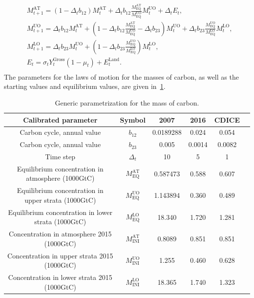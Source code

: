 \documentclass[11pt, a4paper, pdftex, twoside, dvipsnames]{article}
\begin{document}
\begin{appendices}
\begin{align}
& \label{eq:MAT_appendix}  M^{\text{AT}}_{t+1} = (1- \Delta_tb_{12}) M^{\text{AT}}_{t} + \Delta_tb_{12} \frac{M^{\text{AT}}_{\text{EQ}}}{M^{\text{UO}}_{\text{EQ}}}M^{\text{UO}}_{t} +  \Delta_t E_t ,\\
  & \label{eq:MUO_appendix}  M^{\text{UO}}_{t+1} = \Delta_tb_{12}M^{\text{AT}}_{t} + (1- \Delta_tb_{12} \frac{M^{\text{AT}}_{\text{EQ}}}{M^{\text{UO}}_{\text{EQ}}} - \Delta_tb_{23})M^{\text{UO}}_{t} + \Delta_tb_{23} \frac{M^{\text{UO}}_{\text{EQ}}}{M^{\text{LO}}_{\text{EQ}}}M^{\text{LO}}_{t} ,\\
  & \label{eq:MLO_appendix}  M^{\text{LO}}_{t+1} = \Delta_tb_{23}M^{\text{UO}}_{t} + (1-\Delta_tb_{23} \frac{M^{\text{UO}}_{\text{EQ}}}{M^{\text{LO}}_{\text{EQ}}})M^{\text{LO}}_{t},\\
  & \label{eq:Emit_appendix} E_t = \sigma_t Y^{\text{Gross}}_{t} (1-\mu_t) + E^{\text{Land}}_t .\\
\end{align}
%
The parameters for the laws of motion for the masses of carbon, as well as the starting values and equilibrium values, are given in~\cref{table:masses}.
\begin{table}[H]
\centering
\begin{tabular}{ c c c c c c } 
 \toprule
 Calibrated parameter & Symbol  & 2007 & 2016 & CDICE \\ 
 \midrule
 Carbon cycle, annual value & $b_{12}$  & 0.0189288 & 0.024 & 0.054 \\ 
 Carbon cycle, annual value & $b_{23}$  & 0.005 & 0.0014 & 0.0082\\ 
 Time step & $\Delta_t$  & 10 & 5 & 1 \\
 Equilibrium concentration in atmosphere (1000GtC) & $M^{\text{AT}}_{\text{EQ}}$  & 0.587473 & 0.588 &  0.607 \\
 Equilibrium concentration in upper strata (1000GtC) & $M^{\text{UO}}_{\text{EQ}}$  & 1.143894 & 0.360 & 0.489 \\
 Equilibrium concentration in lower strata (1000GtC) & $M^{\text{LO}}_{\text{EQ}}$  & 18.340 & 1.720 & 1.281 \\
 Concentration in atmosphere 2015 (1000GtC) & $M^\text{AT}_\text{INI}$  & 0.8089 & 0.851 & 0.851\\
 Concentration in upper strata 2015 (1000GtC) & $M^\text{UO}_\text{INI}$  & 1.255& 0.460 & 0.628\\
 Concentration in lower strata 2015 (1000GtC) & $M^\text{LO}_\text{INI}$  & 18.365 & 1.740 & 1.323\\
 \bottomrule
\end{tabular}
\caption{Generic parametrization for the mass of carbon.}
\label{table:masses}
\end{table}


\end{appendices}
\end{document}
